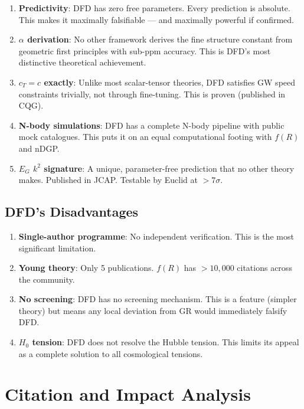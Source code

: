 \documentclass[11pt,a4paper]{article}
\begin{document}
\begin{enumerate}
\item \textbf{Predictivity}: DFD has zero free parameters. Every prediction is absolute. This makes it maximally falsifiable --- and maximally powerful if confirmed.

\item \textbf{$\alpha$ derivation}: No other framework derives the fine structure constant from geometric first principles with sub-ppm accuracy. This is DFD's most distinctive theoretical achievement.

\item \textbf{$c_T = c$ exactly}: Unlike most scalar-tensor theories, DFD satisfies GW speed constraints trivially, not through fine-tuning. This is proven (published in CQG).

\item \textbf{N-body simulations}: DFD has a complete N-body pipeline with public mock catalogues. This puts it on an equal computational footing with $f(R)$ and nDGP.

\item \textbf{$E_G$ $k^2$ signature}: A unique, parameter-free prediction that no other theory makes. Published in JCAP. Testable by Euclid at $> 7\sigma$.
\end{enumerate}

\subsection{DFD's Disadvantages}

\begin{enumerate}
\item \textbf{Single-author programme}: No independent verification. This is the most significant limitation.
\item \textbf{Young theory}: Only 5 publications. $f(R)$ has $> 10{,}000$ citations across the community.
\item \textbf{No screening}: DFD has no screening mechanism. This is a feature (simpler theory) but means any local deviation from GR would immediately falsify DFD.
\item \textbf{$H_0$ tension}: DFD does not resolve the Hubble tension. This limits its appeal as a complete solution to all cosmological tensions.
\end{enumerate}

\section{Citation and Impact Analysis}
\end{document}
